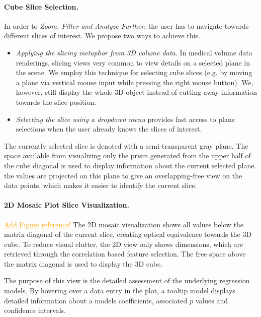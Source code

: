 \documentclass[journal]{style/vgtc} 			          %
\newcommand{\com}[1]{\textcolor{orange}{\uline{#1}}}
\begin{document}
\paragraph{Cube Slice Selection.}
In order to \emph{Zoom, Filter and Analyze Further}, the user has to navigate towards different slices of interest.
We propose two ways to achieve this.
\begin{itemize}
	\item \emph{Applying the slicing metaphor from 3D volume data.}
	In medical volume data renderings, slicing views very common to view details on a selected plane in the scene.
	We employ this technique for selecting cube slices (e.g. by moving a plane via vertical mouse input while pressing the right mouse button).
	We, however, still display the whole 3D-object instead of cutting away information towards the slice position.
	\item \emph{Selecting the slice using a dropdown menu} provides fast access to plane selections when the user already knows the slices of interest.
\end{itemize}
The currently selected slice is denoted with a semi-transparent gray plane.
The space available from visualizing only the prism generated from the upper half of the cube diagonal is used to display information about the current selected plane.
the values are projected on this plane to give an overlapping-free view on the data points, which makes it easier to identify the current slice.
\paragraph{2D Mosaic Plot Slice Visualization.}
\com{Add Figure reference!}
The 2D mosaic visualization shows all values below the matrix diagonal of the current slice, creating optical equivalence towards the 3D cube.
To reduce visual clutter, the 2D view only shows dimensions, which are retrieved through the correlation based feature selection.
The free space above the matrix diagonal is used to display the 3D cube.

The purpose of this view is the detailed assessment of the underlying regression models.
By hovering over a data entry in the plot, a tooltip model displays detailed information about a models coefficients, associated $p$ values and confidence intervals.
\end{document}
